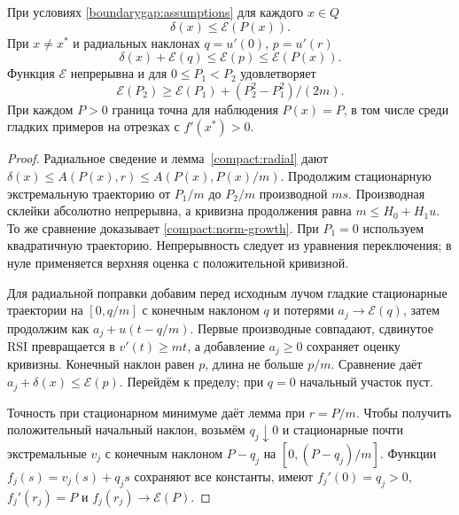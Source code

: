 \begin{theorem}
\label{bndnorm:main}\label{energy:main}
При условиях \eqref{boundarygap:assumptions} для каждого $x\in Q$
\begin{equation}\label{bndnorm:observable}
 \delta(x)\le\mathcal E(P(x)).
\end{equation}
При $x\ne x^*$ и радиальных наклонах $q=u'(0)$, $p=u'(r)$
\begin{equation}\label{bndnorm:radial-deficit}
 \delta(x)+\mathcal E(q)\le\mathcal E(p)\le\mathcal E(P(x)).
\end{equation}
Функция $\mathcal E$ непрерывна и для $0\le P_1<P_2$ удовлетворяет
\begin{equation}\label{compact:norm-growth}
 \mathcal E(P_2)\ge\mathcal E(P_1)+(P_2^2-P_1^2)/(2m).
\end{equation}
При каждом $P>0$ граница точна для наблюдения $P(x)=P$, в том
числе среди гладких примеров на отрезках с $f'(x^*)>0$.
\end{theorem}
\begin{proof}
Радиальное сведение и лемма~\ref{compact:radial} дают
$\delta(x)\le A(P(x),r)\le A(P(x),P(x)/m)$.
Продолжим стационарную экстремальную траекторию от $P_1/m$
до $P_2/m$ производной $ms$. Производная склейки абсолютно
непрерывна, а кривизна продолжения равна $m\le H_0+H_1u$.
То же сравнение доказывает \eqref{compact:norm-growth}.
При $P_1=0$ используем квадратичную траекторию.
Непрерывность следует из уравнения переключения; в нуле
применяется верхняя оценка с положительной кривизной.

Для радиальной поправки добавим перед исходным лучом гладкие
стационарные траектории на $[0,q/m]$ с конечным наклоном $q$
и потерями $a_j\to\mathcal E(q)$, затем продолжим как
$a_j+u(t-q/m)$. Первые производные совпадают, сдвинутое RSI
превращается в $v'(t)\ge mt$, а добавление $a_j\ge0$ сохраняет
оценку кривизны. Конечный наклон равен $p$, длина не больше $p/m$.
Сравнение даёт $a_j+\delta(x)\le\mathcal E(p)$.
Перейдём к пределу; при $q=0$ начальный участок пуст.

Точность при стационарном минимуме даёт лемма при $r=P/m$.
Чтобы получить положительный начальный наклон, возьмём
$q_j\downarrow0$ и стационарные почти экстремальные $v_j$
с конечным наклоном $P-q_j$ на $[0,(P-q_j)/m]$.
Функции $f_j(s)=v_j(s)+q_js$ сохраняют все константы,
имеют $f_j'(0)=q_j>0$, $f_j'(r_j)=P$ и
$f_j(r_j)\to\mathcal E(P)$.
\end{proof}

